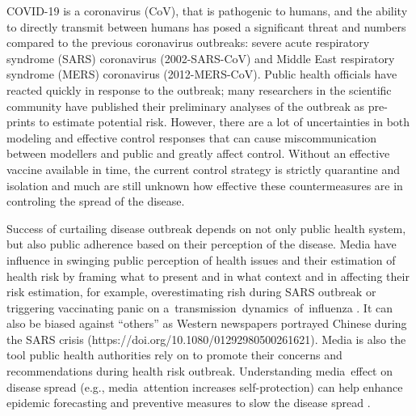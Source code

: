 COVID-19 is a coronavirus (CoV), that is pathogenic to humans, and the ability to directly transmit between humans has posed a significant threat and numbers compared to the previous coronavirus outbreaks: severe acute respiratory syndrome (SARS) coronavirus (2002-SARS-CoV) and Middle East respiratory syndrome (MERS) coronavirus (2012-MERS-CoV). 
Public health officials have reacted quickly in response to the outbreak; many researchers in the scientific community have published their preliminary analyses of the outbreak as pre-prints to estimate potential risk. 
However, there are a lot of uncertainties in both modeling and effective control responses that can cause miscommunication between modellers and public and greatly affect control.   
Without an effective vaccine available in time, the current control strategy is strictly quarantine and isolation and much are still unknown how effective these countermeasures are in controling the spread of the disease.  


Success of curtailing disease outbreak depends on not only public health system, but also public adherence based on their perception of the disease.  Media have influence in swinging public perception of health issues and their estimation of health risk by framing what to present and in what context and in affecting their risk estimation, for example, overestimating rish during SARS outbreak \citep{BerrWalf07} or triggering vaccinating panic on a transmission dynamics of influenza \citep{TuchDube11}.  It can also be biased against “others” as Western newspapers portrayed Chinese during the SARS crisis \citep{HuanLeun06} (https://doi.org/10.1080/01292980500261621).  Media is also the tool public health authorities rely on to promote their concerns and recommendations during health risk outbreak.  Understanding media effect on disease spread (e.g., media attention increases self-protection) can help enhance epidemic forecasting and preventive measures to slow the disease spread \citep{KimFast19}.  

